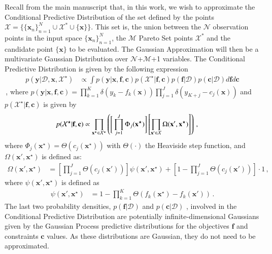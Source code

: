 \documentclass[review,preprint,12pt]{elsarticle}
\begin{document}
Recall from the main manuscript that, in this work, we wish to approximate the Conditional Predictive Distribution of the set defined by the points $\mathcal{X} = \{\{\boldsymbol{x}_n\}_{n=1}^{N} \cup \mathcal{X}^* \cup \{\boldsymbol{x}\}\}$. This set is, the union between the $\mathcal{N}$ observation points in the input space $\{\boldsymbol{x}_n\}_{n=1}^{N}$, the $\mathcal{M}$ Pareto Set points $\mathcal{X}^*$ and the candidate point $\{\boldsymbol{x}\}$ to be evaluated. The Gaussian Approximation will then be a multivariate Gaussian Distribution over $\mathcal{N}$+$\mathcal{M}$+1 variables. The Conditional Predictive Distribution is given by the following expression
\begin{align}
p(\textbf{y}|\mathcal{D}, \textbf{x}, \mathcal{X}^{\star}) & \propto 
	\int p(\textbf{y}|\textbf{x},\textbf{f},\textbf{c}) 
	p(\mathcal{X}^{\star}|\textbf{f},\textbf{c}) p(\textbf{f}|\mathcal{D}) p(\textbf{c}|\mathcal{D})
 d\textbf{f} d\textbf{c}
\end{align}\,,
where $p(\textbf{y}|\textbf{x},\textbf{f},\textbf{c}) = \prod_{k=1}^{K}\delta(y_k - f_k(\textbf{x})) 
\prod_{j=1}^{J}\delta (y_{K+j} - c_j(\textbf{x}))$ and $p(\mathcal{X}^{\star}|\textbf{f},\textbf{c})$ is given by
\begin{align}
\hspace{-.2cm}
p(\mathcal{X}^{\star}|\textbf{f},\textbf{c}) & \propto 
	\prod_{\textbf{x}^\star\in \mathcal{X}^\star} 
	\left(
	\Bigg[\prod_{j=1}^{J}\Phi_j(\textbf{x}^{\star})\Bigg]
	\left[ 
	\prod_{\textbf{x}'\in \mathcal{X}} 
	\Omega(\textbf{x}',\textbf{x}^{\star})
	\right]	
	\right)
	\,,
	\label{eq:x_star}
\end{align}
where $\Phi_j(\mathbf{x}^\star) = \Theta(c_j(\mathbf{x}^\star))$ with $\Theta(\cdot)$ the Heaviside step function, 
and $\Omega(\textbf{x}',\textbf{x}^{\star})$ is defined as:
\begin{align}
\Omega(\textbf{x}',\textbf{x}^{\star}) & = \left[\prod_{j=1}^{J}\Theta(c_j(\mathbf{x}'))\right] 
	\psi(\textbf{x}',\textbf{x}^{\star}) + \left[1 - \prod_{j=1}^{J}\Theta(c_j(\textbf{x}')) \right] \cdot 1
\,,
	\label{eq:omega}
\end{align}
where $\psi(\textbf{x}',\textbf{x}^{\star})$ is defined as
\begin{align}
\psi(\textbf{x}',\textbf{x}^{\star}) & = 1 - \prod_{k=1}^K \Theta (f_k(\textbf{x}^{\star})-f_k(\textbf{x}'))
\,.  \label{eq:psi}
\end{align}
The last two probability densities, $p(\textbf{f}|\mathcal{D})$ and $p(\textbf{c}|\mathcal{D})$ , involved in the Conditional Predictive Distribution are potentially infinite-dimensional Gaussians given by the Gaussian Process predictive distributions for the objectives $\textbf{f}$ and constraints $\textbf{c}$ values. As these distributions are Gaussian, they do not need to be approximated.
\end{document}
